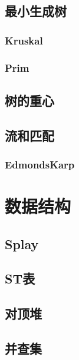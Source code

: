 \documentclass{article}
\begin{document}
\begin{multicols*}{3}
\subsection{最小生成树}
\subsubsection{Kruskal}


\subsubsection{Prim}


\subsection{树的重心}


\subsection{流和匹配}
\subsubsection{EdmondsKarp}


\section{数据结构}
\subsection{Splay}


\subsection{ST表}


\subsection{对顶堆}


\subsection{并查集}



\end{multicols*}
\end{document}
